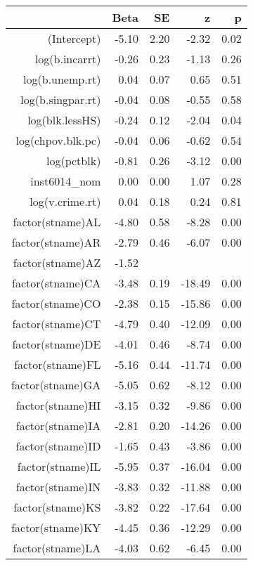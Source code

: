\begin{table}[ht]
\centering
\begin{tabular}{rrrrr}
  \hline
 & Beta & SE & z & p \\ 
  \hline
(Intercept) & -5.10 & 2.20 & -2.32 & 0.02 \\ 
  log(b.incarrt) & -0.26 & 0.23 & -1.13 & 0.26 \\ 
  log(b.unemp.rt) & 0.04 & 0.07 & 0.65 & 0.51 \\ 
  log(b.singpar.rt) & -0.04 & 0.08 & -0.55 & 0.58 \\ 
  log(blk.lessHS) & -0.24 & 0.12 & -2.04 & 0.04 \\ 
  log(chpov.blk.pc) & -0.04 & 0.06 & -0.62 & 0.54 \\ 
  log(pctblk) & -0.81 & 0.26 & -3.12 & 0.00 \\ 
  inst6014\_nom & 0.00 & 0.00 & 1.07 & 0.28 \\ 
  log(v.crime.rt) & 0.04 & 0.18 & 0.24 & 0.81 \\ 
  factor(stname)AL & -4.80 & 0.58 & -8.28 & 0.00 \\ 
  factor(stname)AR & -2.79 & 0.46 & -6.07 & 0.00 \\ 
  factor(stname)AZ & -1.52 &  &  &  \\ 
  factor(stname)CA & -3.48 & 0.19 & -18.49 & 0.00 \\ 
  factor(stname)CO & -2.38 & 0.15 & -15.86 & 0.00 \\ 
  factor(stname)CT & -4.79 & 0.40 & -12.09 & 0.00 \\ 
  factor(stname)DE & -4.01 & 0.46 & -8.74 & 0.00 \\ 
  factor(stname)FL & -5.16 & 0.44 & -11.74 & 0.00 \\ 
  factor(stname)GA & -5.05 & 0.62 & -8.12 & 0.00 \\ 
  factor(stname)HI & -3.15 & 0.32 & -9.86 & 0.00 \\ 
  factor(stname)IA & -2.81 & 0.20 & -14.26 & 0.00 \\ 
  factor(stname)ID & -1.65 & 0.43 & -3.86 & 0.00 \\ 
  factor(stname)IL & -5.95 & 0.37 & -16.04 & 0.00 \\ 
  factor(stname)IN & -3.83 & 0.32 & -11.88 & 0.00 \\ 
  factor(stname)KS & -3.82 & 0.22 & -17.64 & 0.00 \\ 
  factor(stname)KY & -4.45 & 0.36 & -12.29 & 0.00 \\ 
  factor(stname)LA & -4.03 & 0.62 & -6.45 & 0.00 \\ 

\end{tabular}
\end{table}
